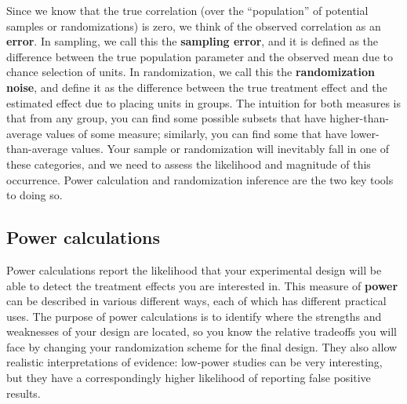Since we know that the true correlation
(over the ``population'' of potential samples or randomizations)
is zero, we think of the observed correlation as an \textbf{error}.
In sampling, we call this the \textbf{sampling error},
and it is defined as the difference between the true population parameter
and the observed mean due to chance selection of units.
In randomization, we call this the \textbf{randomization noise},
and define it as the difference between the true treatment effect
and the estimated effect due to placing units in groups.
The intuition for both measures is that from any group,
you can find some possible subsets that have higher-than-average values of some measure;
similarly, you can find some that have lower-than-average values.
Your sample or randomization will inevitably fall in one of these categories,
and we need to assess the likelihood and magnitude of this occurrence.
Power calculation and randomization inference are the two key tools to doing so.

\subsection{Power calculations}

Power calculations report the likelihood that your experimental design
will be able to detect the treatment effects you are interested in.
This measure of \textbf{power} can be described in various different ways,
each of which has different practical uses.
The purpose of power calculations is to identify where the strengths and weaknesses
of your design are located, so you know the relative tradeoffs you will face
by changing your randomization scheme for the final design.
They also allow realistic interpretations of evidence:
low-power studies can be very interesting,
but they have a correspondingly higher likelihood
of reporting false positive results.

